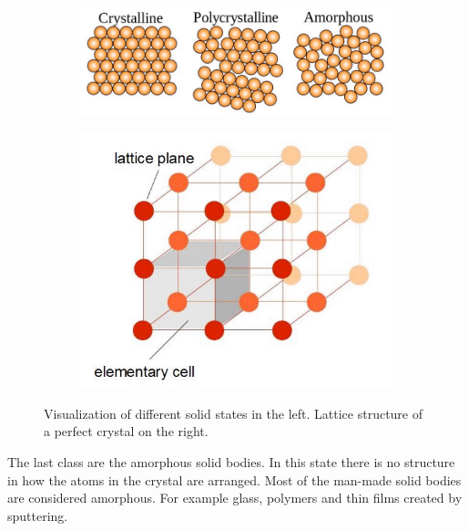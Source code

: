 \documentclass[]{article}
\begin{document}
\begin{figure}[H]
\centering
\begin{subfigure}[h]{0.59\textwidth}
\includegraphics[width=1\textwidth]{Plots/crystalline.png}
\end{subfigure}
\begin{subfigure}[h]{0.39\textwidth}
\includegraphics[width=1\textwidth]{Plots/lattice.png}
\end{subfigure}
\caption{Visualization of different solid states in the left. Lattice structure of a perfect crystal on the right. \cite{wiki}}
\label{fig:crystal structure}
\end{figure}


The last class are the amorphous solid bodies. In this state there is no structure in how the atoms in the crystal are arranged. Most of the man-made solid bodies are considered amorphous. For example glass, polymers and thin films created by sputtering. 
\end{document}
